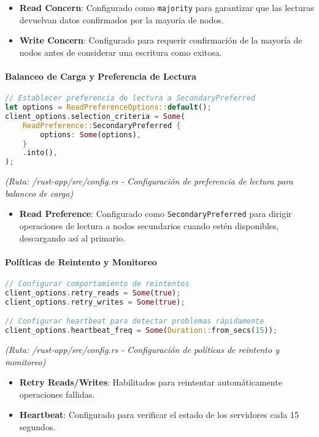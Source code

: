 \documentclass[12pt,letterpaper]{article}
\begin{document}
\begin{itemize}
    \item \textbf{Read Concern}: Configurado como \texttt{majority} para garantizar que las lecturas devuelvan datos confirmados por la mayoría de nodos.
    \item \textbf{Write Concern}: Configurado para requerir confirmación de la mayoría de nodos antes de considerar una escritura como exitosa.
\end{itemize}

\paragraph{Balanceo de Carga y Preferencia de Lectura}
\begin{lstlisting}[language=rust]
// Establecer preferencia de lectura a SecondaryPreferred
let options = ReadPreferenceOptions::default();
client_options.selection_criteria = Some(
    ReadPreference::SecondaryPreferred {
        options: Some(options),
    }
    .into(),
);
\end{lstlisting}
\textit{(Ruta: /rust-app/src/config.rs - Configuración de preferencia de lectura para balanceo de carga)}

\begin{itemize}
    \item \textbf{Read Preference}: Configurado como \texttt{SecondaryPreferred} para dirigir operaciones de lectura a nodos secundarios cuando estén disponibles, descargando así al primario.
\end{itemize}

\paragraph{Políticas de Reintento y Monitoreo}
\begin{lstlisting}[language=rust]
// Configurar comportamiento de reintentos
client_options.retry_reads = Some(true);
client_options.retry_writes = Some(true);

// Configurar heartbeat para detectar problemas rápidamente
client_options.heartbeat_freq = Some(Duration::from_secs(15));
\end{lstlisting}
\textit{(Ruta: /rust-app/src/config.rs - Configuración de políticas de reintento y monitoreo)}

\begin{itemize}
    \item \textbf{Retry Reads/Writes}: Habilitados para reintentar automáticamente operaciones fallidas.
    \item \textbf{Heartbeat}: Configurado para verificar el estado de los servidores cada 15 segundos.
\end{itemize}
\end{document}
